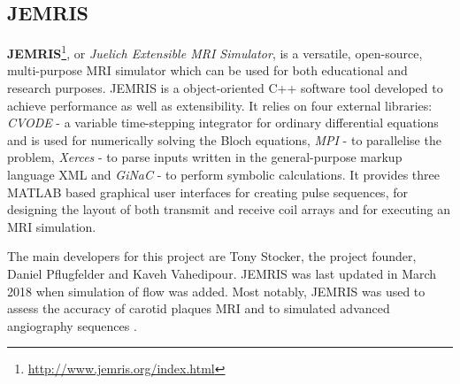 \subsection{JEMRIS}
\textbf{JEMRIS}\footnote{\url{http://www.jemris.org/index.html}}, or \textit{Juelich Extensible MRI Simulator}, is a versatile, open-source, multi-purpose MRI simulator which can be used for both educational and research purposes.
JEMRIS is a object-oriented C++ software tool developed to achieve performance as well as extensibility.
It relies on four external libraries: \textit{CVODE} - a variable time-stepping integrator for ordinary differential equations and is used for numerically solving the Bloch equations, \textit{MPI} - to parallelise the problem, \textit{Xerces} - to parse inputs written in the general-purpose markup language XML and \textit{GiNaC} - to perform symbolic calculations. 
It provides three MATLAB based graphical user interfaces for creating pulse sequences, for designing the layout of both transmit and receive coil arrays and for executing an MRI simulation.

\hfill

The main developers for this project are Tony Stocker, the project founder, Daniel Pflugfelder and Kaveh Vahedipour.
JEMRIS was last updated in March 2018 when simulation of flow was added.
Most notably, JEMRIS was used to assess the accuracy of carotid plaques MRI \cite{Nieuwstadt2014} and to simulated advanced angiography sequences \cite{Fortin2016}.

\hfill

